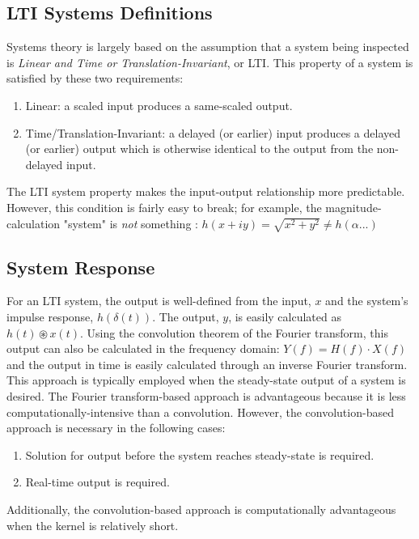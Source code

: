 \subsection{LTI Systems Definitions}
Systems theory is largely based on the assumption that a system being inspected is \emph{Linear and Time or Translation-Invariant}, or LTI. This property of a system is satisfied by these two requirements: 
\begin{enumerate}
	\item Linear: a scaled input produces a same-scaled output.
	\item Time/Translation-Invariant: a delayed (or earlier) input produces a delayed (or earlier) output which is otherwise identical to the output from the non-delayed input.
\end{enumerate}
The LTI system property makes the input-output relationship more predictable. However, this condition is fairly easy to break; for example, the magnitude-calculation "system" is \emph{not} something : $h(x+iy) = \sqrt{x^2 + y^2} \neq  h(\alpha ...)$

\subsection{System Response}
For an LTI system, the output is well-defined from the input, $x$ and the system's impulse response, $h(\delta(t))$. The output, $y$, is easily calculated as $h(t)\circledast x(t)$. Using the convolution theorem of the Fourier transform, this output can also be calculated in the frequency domain: $Y(f) = H(f)\cdot X(f)$ and the output in time is easily calculated through an inverse Fourier transform. This approach is typically employed when the steady-state output of a system is desired. The Fourier transform-based approach is advantageous because it is less computationally-intensive than a convolution. However, the convolution-based approach is necessary in the following cases:
\begin{enumerate}
	\item Solution for output before the system reaches steady-state is required.
	\item Real-time output is required.
\end{enumerate}
Additionally, the convolution-based approach is computationally advantageous when the kernel is relatively short.